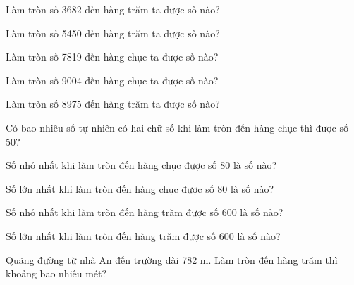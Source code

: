\begin{ex}
Làm tròn số 3682 đến hàng trăm ta được số nào?
\end{ex}

\begin{ex}
Làm tròn số 5450 đến hàng trăm ta được số nào?
\end{ex}

\begin{ex}
Làm tròn số 7819 đến hàng chục ta được số nào?
\end{ex}

\begin{ex}
Làm tròn số 9004 đến hàng chục ta được số nào?
\end{ex}

\begin{ex}
Làm tròn số 8975 đến hàng trăm ta được số nào?
\end{ex}

\begin{ex}
Có bao nhiêu số tự nhiên có hai chữ số khi làm tròn đến hàng chục thì được số 50?
\end{ex}

\begin{ex}
Số nhỏ nhất khi làm tròn đến hàng chục được số 80 là số nào?
\end{ex}

\begin{ex}
Số lớn nhất khi làm tròn đến hàng chục được số 80 là số nào?
\end{ex}

\begin{ex}
Số nhỏ nhất khi làm tròn đến hàng trăm được số 600 là số nào?
\end{ex}

\begin{ex}
Số lớn nhất khi làm tròn đến hàng trăm được số 600 là số nào?
\end{ex}

\begin{ex}
Quãng đường từ nhà An đến trường dài 782 m. Làm tròn đến hàng trăm thì khoảng bao nhiêu mét?
\end{ex}

